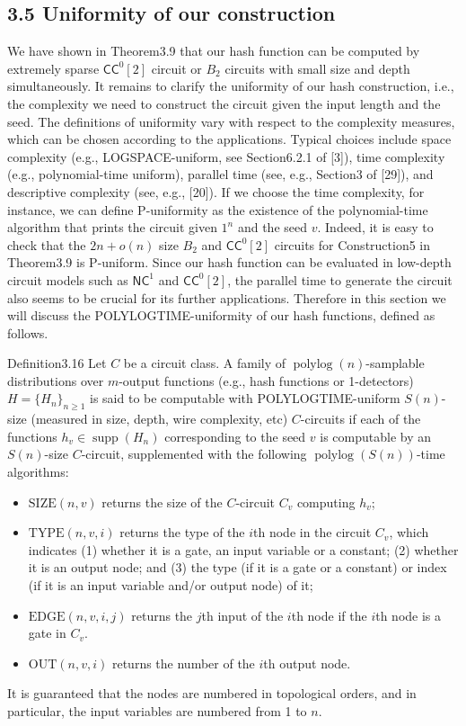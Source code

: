\subsection*{3.5 Uniformity of our construction}
We have shown in Theorem3.9 that our hash function can be computed by extremely sparse $\mathsf{CC}^0[2]$ circuit or $B_2$ circuits with small size and depth simultaneously. It remains to clarify the uniformity of our hash construction, i.e., the complexity we need to construct the circuit given the input length and the seed.
The definitions of uniformity vary with respect to the complexity measures, which can be chosen according to the applications. Typical choices include space complexity (e.g., LOGSPACE-uniform, see Section6.2.1 of [3]), time complexity (e.g., polynomial-time uniform), parallel time (see, e.g., Section3 of [29]), and descriptive complexity (see, e.g., [20]). If we choose the time complexity, for instance, we can define P-uniformity as the existence of the polynomial-time algorithm that prints the circuit given $1^n$ and the seed $v$. Indeed, it is easy to check that the $2n+o(n)$ size $B_2$ and $\mathsf{CC}^0[2]$ circuits for Construction5 in Theorem3.9 is P-uniform.
Since our hash function can be evaluated in low-depth circuit models such as $\mathsf{NC}^1$ and $\mathsf{CC}^0[2]$, the parallel time to generate the circuit also seems to be crucial for its further applications. Therefore in this section we will discuss the POLYLOGTIME-uniformity of our hash functions, defined as follows.
\begin{authorclaim}{Definition3.16}
Let $C$ be a circuit class. A family of $\operatorname{polylog}(n)$-samplable distributions over $m$-output functions (e.g., hash functions or 1-detectors) $H=\{H_n\}_{n\ge1}$ is said to be computable with POLYLOGTIME-uniform $S(n)$-size (measured in size, depth, wire complexity, etc) $C$-circuits if each of the functions $h_v\in\operatorname{supp}(H_n)$ corresponding to the seed $v$ is computable by an $S(n)$-size $C$-circuit, supplemented with the following $\operatorname{polylog}(S(n))$-time algorithms:
\begin{itemize}
\item $\mathrm{SIZE}(n,v)$ returns the size of the $C$-circuit $C_v$ computing $h_v$;
\item $\mathrm{TYPE}(n,v,i)$ returns the type of the $i$th node in the circuit $C_v$, which indicates (1) whether it is a gate, an input variable or a constant; (2) whether it is an output node; and (3) the type (if it is a gate or a constant) or index (if it is an input variable and/or output node) of it;
\item $\mathrm{EDGE}(n,v,i,j)$ returns the $j$th input of the $i$th node if the $i$th node is a gate in $C_v$.
\item $\mathrm{OUT}(n,v,i)$ returns the number of the $i$th output node.
\end{itemize}
It is guaranteed that the nodes are numbered in topological orders, and in particular, the input variables are numbered from 1 to $n$.
\end{authorclaim}
